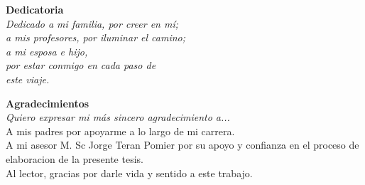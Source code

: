 \documentclass[12pt]{book}
\title{
    \textbf{
      \Large{UNIVERSIDAD MAYOR DE SAN ANDR\'ES}\\
      \normalsize{
        FACULTAD DE CIENCIAS PURAS Y NATURALES\\
        CARRERA DE INFORM\'ATICA\\
      }
      \hfill \break
      \texttt{[image: umsa]}
      \break
      \begin{large}
        EVALUACION COMPARATIVA DE MODELOS GENERADORES DE GRAFOS ALEATORIOS PARA REDES COMPLEJAS
      \end{large}
      \break
      \small{
        Tesis de Grado para obtener el Título de Licenciatura en Informática \break
        Mención Ingeniería de Sistemas Informáticos\break
      }
      \break
      \large {
        POR: CARLOS MIJAEL TOLA APAZA\\
        TUTOR: M.Sc. JORGE TERAN
      }
      \break
      \small {
        LA PAZ - BOLIVIA \break
        Abril, 2024
      }
    }
}
\author{}
\date{}
\begin{document}
\maketitle


\newpage
\thispagestyle{empty}
\vspace*{\fill} 

\begin{flushright}
  \textbf{Dedicatoria} \\
\textit{Dedicado a mi familia, por creer en mí;\\
 a mis profesores, por iluminar el camino;\\ 
a mi esposa e hijo, \\ 
por estar conmigo en cada paso de  \\
este viaje.}
\end{flushright}

\vspace{2cm} 
\newpage

\thispagestyle{empty} 

\vspace*{\fill} 

\begin{flushleft}
\textbf{Agradecimientos}\\ 
\textit{Quiero expresar mi más sincero agradecimiento a...}\\ %
A mis padres por apoyarme a lo largo de mi carrera. \\
A mi asesor M. Sc Jorge Teran Pomier por su apoyo y confianza en el proceso de elaboracion
de la presente tesis.\\
Al lector, gracias por darle vida y sentido a este trabajo.
\end{flushleft}

\vspace*{\fill} %

\newpage

\tableofcontents


\doublespacing
{} %








\end{document}
